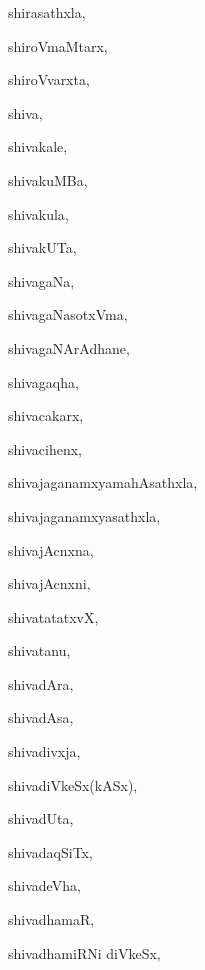 \begin{multicols}{3}
{\noindent
{shirasathxla}, \pageref{shirasathxla}

\noindent
{shiroVmaMtarx}, \pageref{shiroVmaMtarx}

\noindent
{shiroVvarxta}, \pageref{shiroVvarxta}

\noindent
{shiva}, \pageref{shiva}

\noindent
{shivakale}, \pageref{shivakale}

\noindent
{shivakuMBa}, \pageref{shivakuMBa}

\noindent
{shivakula}, \pageref{shivakula}

\noindent
{shivakUTa}, \pageref{shivakUTa}

\noindent
{shivagaNa}, \pageref{shivagaNa}

\noindent
{shivagaNasotxVma}, \pageref{shivagaNasotxVma}

\noindent
{shivagaNArAdhane}, \pageref{shivagaNArAdhane}

\noindent
{shivagaqha}, \pageref{shivagaqha}

\noindent
{shivacakarx}, \pageref{shivacakarx}

\noindent
{shivacihenx}, \pageref{shivacihenx}

\noindent
{shivajaganamxyamahAsathxla}, \pageref{shivajaganamxyamahAsathxla}

\noindent
{shivajaganamxyasathxla}, \pageref{shivajaganamxyasathxla}

\noindent
{shivajAcnxna}, \pageref{shivajAcnxna}

\noindent
{shivajAcnxni}, \pageref{shivajAcnxni}

\noindent
{shivatatatxvX}, \pageref{shivatatatxvX}

\noindent
{shivatanu}, \pageref{shivatanu}

\noindent
{shivadAra}, \pageref{shivadAra}

\noindent
{shivadAsa}, \pageref{shivadAsa}

\noindent
{shivadivxja}, \pageref{shivadivxja}

\noindent
{shivadiVkeSx(kASx)}, \pageref{shivadiVkeSxkASx}

\noindent
{shivadUta}, \pageref{shivadUta}

\noindent
{shivadaqSiTx}, \pageref{shivadaqSiTx}

\noindent
{shivadeVha}, \pageref{shivadeVha}

\noindent
{shivadhamaR}, \pageref{shivadhamaR}

\noindent
{shivadhamiRNi diVkeSx}, \pageref{shivadhamiRNidiVkeSx}

}
\end{multicols}
